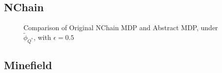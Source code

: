 \documentclass{article}
\newcommand{\ep}{\widetilde \phi}
\newcommand{\epQ}{\ep_{Q^*}}
\begin{document}
\subsection{NChain}


\begin{figure}
\label{fig:eps-states}
\caption{Comparison of Original NChain MDP and Abstract MDP, under $\epQ$, with $\epsilon=0.5$}
\end{figure} 

\subsection{Minefield}
\end{document}
